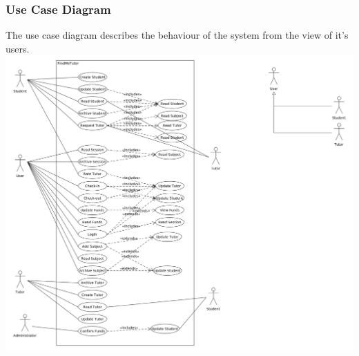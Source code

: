 \documentclass[12pt]{article}
\begin{document}
\subsubsection{Use Case Diagram}
The use case diagram describes the behaviour of the system from the view of it's users.\\ 
\includegraphics[width=140mm]{./Use_Case_Diagram.png}
\end{document}
